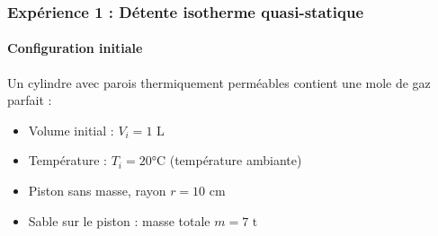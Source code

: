 \documentclass[french]{yLectureNote}
\begin{document}














\subsubsection{Expérience 1 : Détente isotherme quasi-statique}

\paragraph{Configuration initiale}
Un cylindre avec parois thermiquement perméables contient une mole de gaz parfait :
\begin{itemize}
    \item Volume initial : $V_i = 1\text{ L}$
    \item Température : $T_i = 20°\text{C}$ (température ambiante)
    \item Piston sans masse, rayon $r = 10\text{ cm}$
    \item Sable sur le piston : masse totale $m = 7\text{ t}$
\end{itemize}
\end{document}
